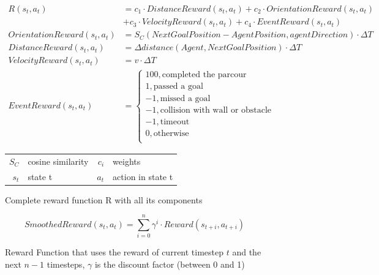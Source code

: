 \begin{figure}
     \centering
     \begin{align}
          R(s_t,a_t) &= c_1 \cdot DistanceReward(s_t,a_t) + c_2 \cdot OrientationReward(s_t,a_t) \nonumber \\
          &  + c_3 \cdot VelocityReward(s_t, a_t) + c_4 \cdot EventReward(s_t, a_t) \nonumber \\
          OrientationReward(s_t,a_t) &= S_C(NextGoalPosition - AgentPosition, agentDirection) \cdot \Delta T \nonumber \\
          DistanceReward(s_t,a_t) &= \Delta distance(Agent, NextGoalPosition) \cdot \Delta T \nonumber \\
          VelocityReward(s_t, a_t) &= v \cdot \Delta T \nonumber \\
          EventReward(s_t, a_t) &= \begin{cases}
               100,           \text{completed the parcour}           \\
               1,             \text{passed a goal}                   \\
               -1,            \text{missed a goal}                   \\
               -1,            \text{collision with wall or obstacle} \\
               -1,            \text{timeout}                         \\
               0,             \text{otherwise}                       \\
          \end{cases} \nonumber
     \end{align}
     \caption{Complete reward function R with all its components}
     \begin{tabular}{r@{: }l r@{: }l}
     $S_C$ & cosine similarity & $c_i$ & weights\\
     $s_t$& state t & $a_t$& action in state t 
     \end{tabular}
     \label{fig:reward_function}
\end{figure}

\iffalse
\begin{figure}
     \[SmoothedReward(s_t,a_t) = \sum_{i=0}^{n} \gamma^{i} \cdot Reward(s_{t+i}, a_{t+i}) \]
     \caption{Reward Function that uses the reward of current timestep $t$ and the next $n-1$ timesteps, $\gamma$ is the discount factor (between 0 and 1)}
\end{figure}

